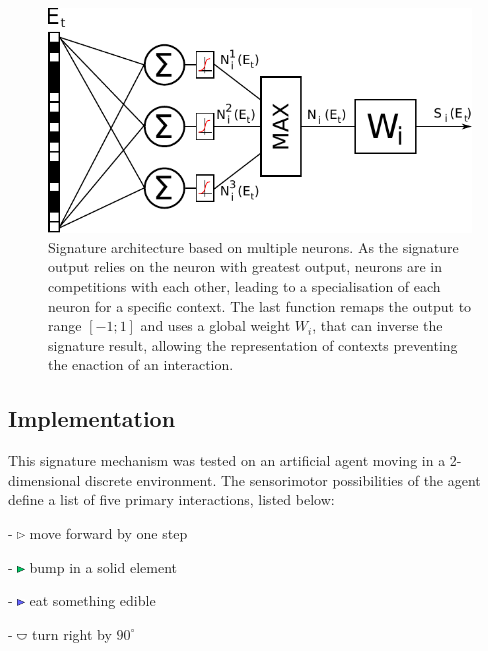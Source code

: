 \documentclass[conference]{IEEEtran}
\begin{document}
\begin{figure}[htbp]
\centerline{\includegraphics[scale=0.7]{img/signature_model.pdf}}
\caption{Signature architecture based on multiple neurons. As the signature output relies on the neuron with greatest output, neurons are in competitions with each other, leading to a specialisation of each neuron for a specific context. The last function remaps the output to range $[-1;1]$ and uses a global weight $W_i$, that can inverse the signature result, allowing the representation of contexts preventing the enaction of an interaction.}
\label{fig}
\end{figure}

\subsection{Implementation}

This signature mechanism was tested on an artificial agent moving in a 2-dimensional discrete environment. The sensorimotor possibilities of the agent define a list of five primary interactions, listed below:

- \includegraphics[width=0.015\textwidth]{img/mf0.pdf} move forward by one step

- \includegraphics[width=0.015\textwidth]{img/mf1.pdf} bump in a solid element 

- \includegraphics[width=0.015\textwidth]{img/mf2.pdf} eat something edible 

- \includegraphics[width=0.02\textwidth]{img/rt0.pdf} turn right by $90^\circ$ 
\end{document}
